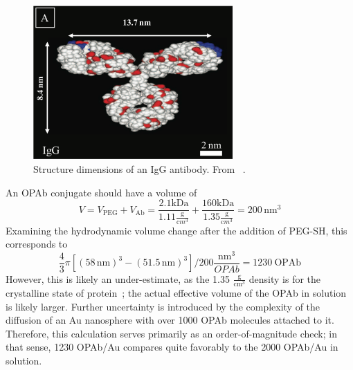 \begin{figure}[htbp]
\centering
\includegraphics[keepaspectratio,width=3in,height=0.75\textheight]{iggstructure.pdf}
\caption{Structure dimensions of an IgG antibody. From ~\citep{antibodylength}.}
\label{iggstructure}
\end{figure}

An OPAb conjugate should have a volume of
\[V=V_{\mathrm{PEG}}+V_{\mathrm{Ab}}=\frac{2.1\mathrm{kDa}}{1.11\frac{\mathrm g}{\mathrm cm^3}}+\frac{160\mathrm{kDa}}{1.35\frac{\mathrm g}{\mathrm cm^3}}=200\,\mathrm{nm}^3\]
Examining the hydrodynamic volume change after the addition of PEG-SH, this corresponds to
\[\frac{4}{3}\pi[(58\mathrm{\,nm})^3-(51.5\mathrm{\,nm})^3]/200\frac{\mathrm{nm}^3}{OPAb}=1230\mathrm{\ OPAb}\]
However, this is likely an under-estimate, as the 1.35 $\mathrm{\frac{g}{cm^3}}$ density is for the crystalline state of protein~\citep{proteindensity}; the actual effective volume of the OPAb in solution is likely larger. Further uncertainty is introduced by the complexity of the diffusion of an Au nanosphere with over 1000 OPAb molecules attached to it. Therefore, this calculation serves primarily as an order-of-magnitude check; in that sense, 1230 OPAb\slash Au compares quite favorably to the 2000 OPAb\slash Au in solution.





